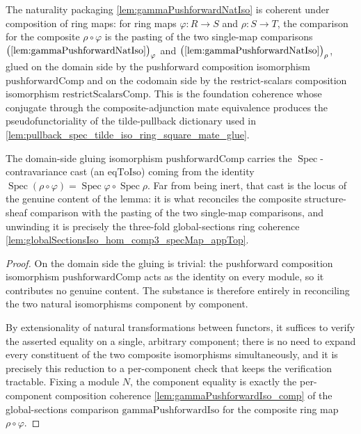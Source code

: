 \begin{lemma}



  \label{lem:gammaPushforwardNatIso_comp}
  The naturality packaging \cref{lem:gammaPushforwardNatIso} is coherent under composition of
  ring maps: for ring maps \(\varphi : R \to S\) and \(\rho : S \to T\), the comparison for the
  composite \(\rho \circ \varphi\) is the pasting of the two single-map comparisons
  \(\bigl(\text{\cref{lem:gammaPushforwardNatIso}}\bigr)_\varphi\) and
  \(\bigl(\text{\cref{lem:gammaPushforwardNatIso}}\bigr)_\rho\), glued on the domain side by the
  pushforward composition isomorphism \(\mathrm{pushforwardComp}\) and on the codomain side by the
  restrict-scalars composition isomorphism \(\mathrm{restrictScalarsComp}\). This is the foundation
  coherence whose conjugate through the composite-adjunction mate equivalence produces the
  pseudofunctoriality of the tilde-pullback dictionary used in
  \cref{lem:pullback_spec_tilde_iso_ring_square_mate_glue}.

  The domain-side gluing isomorphism \(\mathrm{pushforwardComp}\) carries the
  \(\operatorname{Spec}\)-contravariance cast (an \(\mathrm{eqToIso}\)) coming from the
  identity \(\operatorname{Spec}(\rho\circ\varphi) = \operatorname{Spec}\varphi \circ
  \operatorname{Spec}\rho\). Far from being inert, that cast is the locus of the genuine
  content of the lemma: it is what reconciles the composite structure-sheaf comparison
  with the pasting of the two single-map comparisons, and unwinding it is precisely the
  three-fold global-sections ring coherence
  \cref{lem:globalSectionsIso_hom_comp3_specMap_appTop}.
  \begin{proof}
    On the domain side the gluing is trivial: the pushforward composition isomorphism
    \(\mathrm{pushforwardComp}\) acts as the identity on every module, so it contributes no
    genuine content. The substance is therefore entirely in reconciling the two natural
    isomorphisms component by component.

    By extensionality of natural transformations between functors, it suffices to verify
    the asserted equality on a single, arbitrary component; there is no need to expand
    every constituent of the two composite isomorphisms simultaneously, and it is precisely
    this reduction to a per-component check that keeps the verification tractable. Fixing a
    module \(N\), the component equality is exactly the per-component composition coherence
    \cref{lem:gammaPushforwardIso_comp} of the global-sections comparison
    \(\mathrm{gammaPushforwardIso}\) for the composite ring map \(\rho\circ\varphi\).


\end{proof}
\end{lemma}

